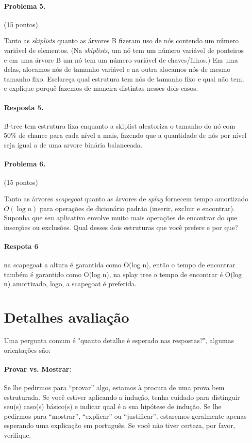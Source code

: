 \documentclass{article}
\begin{document}
\paragraph{Problema 5.} (15 pontos)

Tanto as \textit{skiplists} quanto as árvores B fizeram uso de nós contendo um número variável de elementos.
(Na \textit{skiplists}, um nó tem um número variável de ponteiros e em uma árvore B um nó
tem um número variável de chaves/filhos.) Em uma delas, alocamos nós de tamanho variável
e na outra alocamos nós de mesmo tamanho fixo. Esclareça qual estrutura tem nós de tamanho fixo e qual não tem, e explique porquê fazemos de maneira distintas nesses dois casos.

\paragraph{Resposta 5.} B-tree tem estrutura fixa enquanto a skiplist aleatoriza o tamanho do nó com 50\% de chance para cada nível a mais, fazendo que a quantidade de nós por nível seja igual a de uma arvore binária balanceada.

\paragraph{Problema 6.} (15 pontos)

Tanto as árvores \textit{scapegoat} quanto as árvores de \textit{splay} fornecem tempo amortizado $O(\log n)$ para
operações de dicionário padrão (inserir, excluir e encontrar). Suponha que seu aplicativo
envolve muito mais operações de encontrar do que inserções ou exclusões. Qual desses dois
estruturas que você prefere e por que?

\paragraph{Respota 6} na scapegoat a altura é garantida como O(log n), então o tempo de encontrar também é garantido como O(log n), na splay tree o tempo de encontrar é O(log n) amortizado, logo, a scapegoat é preferida.

\section{Detalhes avaliação}
Uma pergunta comum é "quanto detalhe é esperado nas respostas?", algumas orientações são:
%
\paragraph{Provar vs. Mostrar:}
Se lhe pedirmos para “provar” algo, estamos à procura de uma prova bem estruturada. Se você estiver aplicando a indução, tenha cuidado para distinguir seu(s) caso(s) básico(s) e indicar qual é a sua hipótese de indução. Se lhe pedirmos para “mostrar”, “explicar” ou “justificar”, estaremos geralmente apenas esperando uma explicação em português. Se você não tiver certeza, por favor, verifique.
\end{document}
